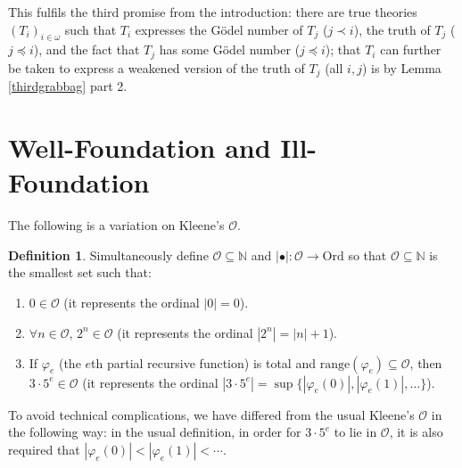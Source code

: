 \documentclass[reqno]{article}
\theoremstyle{definition}
\newtheorem{definition}[theorem]{Definition}
\def\N{\mathbb{N}}
\def\O{\mathcal{O}}
\begin{document}
This fulfils the third promise from the introduction:
there are true theories $(T_i)_{i\in\omega}$ such that $T_i$ expresses
the G\"odel number of $T_j$ ($j\prec i$), the truth of $T_j$ 
($j\preceq i$), and the fact that $T_j$ has some G\"odel number ($j\preceq 
i$); that $T_i$ can further be taken to express a weakened version of the 
truth of $T_j$ (all $i,j$) is by Lemma \ref{thirdgrabbag} part 2.


\section{Well-Foundation and Ill-Foundation}

The following is a variation on Kleene's $\O$.

\begin{definition}
\label{kleeneodefn}
Simultaneously define $\O\subseteq\N$
and $|\bullet|:\O\to\mathrm{Ord}$ so that
$\O\subseteq\N$
is the smallest set such that:
\begin{enumerate}
\item $0\in\O$ (it represents the ordinal $|0|=0$).
\item $\forall n\in\O$, $2^n\in \O$ (it represents the ordinal $|2^n|=|n|+1$).
\item If $\varphi_e$ (the $e$th partial recursive function) is total
and $\mathrm{range}(\varphi_e)\subseteq\O$,
then $3\cdot 5^e\in\O$
(it represents the ordinal $|3\cdot 5^e|=\sup\{|\varphi_e(0)|,|\varphi_e(1)|,\ldots\}$).
\end{enumerate}
\end{definition}

To avoid technical complications,
we have differed from the usual Kleene's $\O$ in the following way:
in the usual definition, in order for $3\cdot5^e$ to lie in $\O$,
it is also required that $|\varphi_e(0)|<|\varphi_e(1)|<\cdots$.
\end{document}
